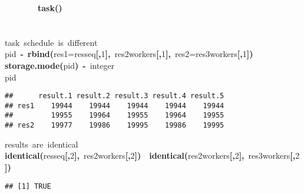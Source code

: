 \documentclass[a4paper,12pt]{article}\usepackage{graphicx, color}
\makeatletter
\newcommand{\hlnumber}[1]{\textcolor[rgb]{0,0,0}{#1}}%
\newcommand{\hlfunctioncall}[1]{\textcolor[rgb]{0.501960784313725,0,0.329411764705882}{\textbf{#1}}}%
\newcommand{\hlstring}[1]{\textcolor[rgb]{0.6,0.6,1}{#1}}%
\newcommand{\hlkeyword}[1]{\textcolor[rgb]{0,0,0}{\textbf{#1}}}%
\newcommand{\hlargument}[1]{\textcolor[rgb]{0.690196078431373,0.250980392156863,0.0196078431372549}{#1}}%
\newcommand{\hlcomment}[1]{\textcolor[rgb]{0.180392156862745,0.6,0.341176470588235}{#1}}%
\newcommand{\hlassignement}[1]{\textcolor[rgb]{0,0,0}{\textbf{#1}}}%
\newcommand{\hlsymbol}[1]{\textcolor[rgb]{0,0,0}{#1}}%
\newcommand{\hlstd}[1]{\textcolor[rgb]{0,0,0}{#1}}%
\newenvironment{kframe}{%
 \def\FrameCommand##1{\hskip\@totalleftmargin \hskip-\fboxsep
 \colorbox{shadecolor}{##1}\hskip-\fboxsep
     \hskip-\linewidth \hskip-\@totalleftmargin \hskip\columnwidth}%
 \MakeFramed {\advance\hsize-\width
   \@totalleftmargin\z@ \linewidth\hsize
   \@setminipage}}%
 {\par\unskip\endMakeFramed}
\newenvironment{knitrout}{}{} %
\renewenvironment{knitrout}{\begin{footnotesize}}{\end{footnotesize}}
\makeatother
\begin{document}
\begin{knitrout}
\begin{kframe}
\begin{flushleft}
\hlstd{}{\ }{\ }{\ }{\ }{\ }{\ }{\ }{\ }\hlfunctioncall{task}\hlkeyword{(}\hlkeyword{)}\hspace*{\fill}\\
\hlstd{}\hlkeyword{\usebox{\hlnormalsizeboxclosebrace}}\hspace*{\fill}\\
\hlstd{}\hspace*{\fill}\\
\hlstd{}\hlcomment{\usebox{\hlnormalsizeboxhash}{\ }task{\ }schedule{\ }is{\ }different}\hspace*{\fill}\\
\hlstd{}\hlsymbol{pid}{\ }\hlassignement{\usebox{\hlnormalsizeboxlessthan}-}{\ }\hlfunctioncall{rbind}\hlkeyword{(}\hlargument{res1}\hlargument{=}\hlsymbol{res\usebox{\hlnormalsizeboxunderscore}seq}\hlkeyword{[}\hlkeyword{,}\hlnumber{1}\hlkeyword{]}\hlkeyword{,}{\ }\hlsymbol{res\usebox{\hlnormalsizeboxunderscore}2workers}\hlkeyword{[}\hlkeyword{,}\hlnumber{1}\hlkeyword{]}\hlkeyword{,}{\ }\hlargument{res2}\hlargument{=}\hlsymbol{res\usebox{\hlnormalsizeboxunderscore}3workers}\hlkeyword{[}\hlkeyword{,}\hlnumber{1}\hlkeyword{]}\hlkeyword{)}\hspace*{\fill}\\
\hlstd{}\hlfunctioncall{storage.mode}\hlkeyword{(}\hlsymbol{pid}\hlkeyword{)}{\ }\hlassignement{\usebox{\hlnormalsizeboxlessthan}-}{\ }\hlstring{\usebox{\hlnormalsizeboxsinglequote}integer\usebox{\hlnormalsizeboxsinglequote}}\hspace*{\fill}\\
\hlstd{}\hlsymbol{pid}\mbox{}
\normalfont
\end{flushleft}
\begin{verbatim}
##      result.1 result.2 result.3 result.4 result.5
## res1    19944    19944    19944    19944    19944
##         19955    19964    19955    19964    19955
## res2    19977    19986    19995    19986    19995
\end{verbatim}
\begin{flushleft}
\ttfamily\noindent
\hlcomment{\usebox{\hlnormalsizeboxhash}{\ }results{\ }are{\ }identical}\hspace*{\fill}\\
\hlstd{}\hlfunctioncall{identical}\hlkeyword{(}\hlsymbol{res\usebox{\hlnormalsizeboxunderscore}seq}\hlkeyword{[}\hlkeyword{,}\hlnumber{2}\hlkeyword{]}\hlkeyword{,}{\ }\hlsymbol{res\usebox{\hlnormalsizeboxunderscore}2workers}\hlkeyword{[}\hlkeyword{,}\hlnumber{2}\hlkeyword{]}\hlkeyword{)}{\ }\hlkeyword{\usebox{\hlnormalsizeboxand}\usebox{\hlnormalsizeboxand}}{\ }\hlfunctioncall{identical}\hlkeyword{(}\hlsymbol{res\usebox{\hlnormalsizeboxunderscore}2workers}\hlkeyword{[}\hlkeyword{,}\hlnumber{2}\hlkeyword{]}\hlkeyword{,}{\ }\hlsymbol{res\usebox{\hlnormalsizeboxunderscore}3workers}\hlkeyword{[}\hlkeyword{,}\hlnumber{2}\hlkeyword{]}\hlkeyword{)}\mbox{}
\normalfont
\end{flushleft}
\begin{verbatim}
## [1] TRUE
\end{verbatim}
\end{kframe}
\end{knitrout}
\end{document}
